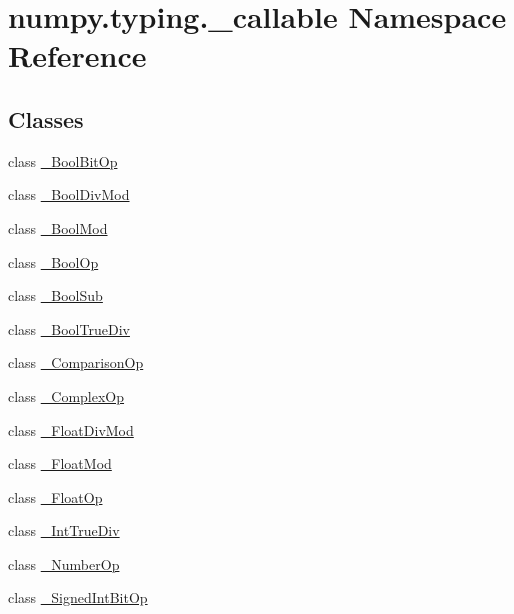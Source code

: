 \hypertarget{namespacenumpy_1_1typing_1_1__callable}{}\section{numpy.\+typing.\+\_\+callable Namespace Reference}
\label{namespacenumpy_1_1typing_1_1__callable}
\subsection*{Classes}
\begin{DoxyCompactItemize}
\item 
class \hyperlink{classnumpy_1_1typing_1_1__callable_1_1__BoolBitOp}{\+\_\+\+Bool\+Bit\+Op}
\item 
class \hyperlink{classnumpy_1_1typing_1_1__callable_1_1__BoolDivMod}{\+\_\+\+Bool\+Div\+Mod}
\item 
class \hyperlink{classnumpy_1_1typing_1_1__callable_1_1__BoolMod}{\+\_\+\+Bool\+Mod}
\item 
class \hyperlink{classnumpy_1_1typing_1_1__callable_1_1__BoolOp}{\+\_\+\+Bool\+Op}
\item 
class \hyperlink{classnumpy_1_1typing_1_1__callable_1_1__BoolSub}{\+\_\+\+Bool\+Sub}
\item 
class \hyperlink{classnumpy_1_1typing_1_1__callable_1_1__BoolTrueDiv}{\+\_\+\+Bool\+True\+Div}
\item 
class \hyperlink{classnumpy_1_1typing_1_1__callable_1_1__ComparisonOp}{\+\_\+\+Comparison\+Op}
\item 
class \hyperlink{classnumpy_1_1typing_1_1__callable_1_1__ComplexOp}{\+\_\+\+Complex\+Op}
\item 
class \hyperlink{classnumpy_1_1typing_1_1__callable_1_1__FloatDivMod}{\+\_\+\+Float\+Div\+Mod}
\item 
class \hyperlink{classnumpy_1_1typing_1_1__callable_1_1__FloatMod}{\+\_\+\+Float\+Mod}
\item 
class \hyperlink{classnumpy_1_1typing_1_1__callable_1_1__FloatOp}{\+\_\+\+Float\+Op}
\item 
class \hyperlink{classnumpy_1_1typing_1_1__callable_1_1__IntTrueDiv}{\+\_\+\+Int\+True\+Div}
\item 
class \hyperlink{classnumpy_1_1typing_1_1__callable_1_1__NumberOp}{\+\_\+\+Number\+Op}
\item 
class \hyperlink{classnumpy_1_1typing_1_1__callable_1_1__SignedIntBitOp}{\+\_\+\+Signed\+Int\+Bit\+Op}
\item 

\end{DoxyCompactItemize}
